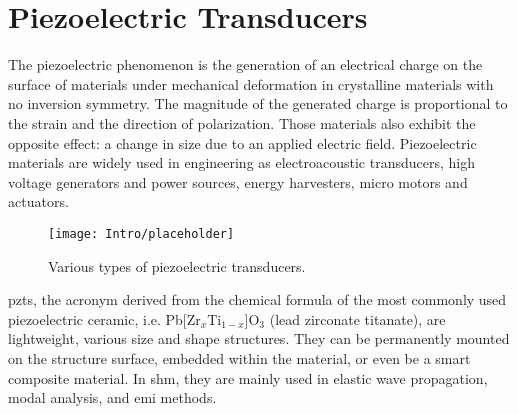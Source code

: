\section{Piezoelectric Transducers}
\label{sec:PZT}

The piezoelectric phenomenon is the generation of an electrical charge on the surface of materials under mechanical deformation in crystalline materials with no inversion symmetry.
The magnitude of the generated charge is proportional to the strain and the direction of polarization.
Those materials also exhibit the opposite effect: a change in size due to an applied electric field.
Piezoelectric materials are widely used in engineering as electroacoustic transducers, high voltage generators and power sources, energy harvesters, micro motors and actuators.
\begin{figure}[H]
	\texttt{[image: Intro/placeholder]}
	\caption{Various types of piezoelectric transducers.}
	\label{fig:piezo}
\end{figure}
\Acp{pzt}, the acronym derived from the chemical formula of the most commonly used piezoelectric ceramic, i.e. Pb[Zr\(_x\)Ti\(_{1-x}\)]O\(_3\) (lead zirconate titanate), are lightweight, various size and shape structures. 
They can be permanently mounted on the structure surface, embedded within the material, or even be a smart composite material.
In \ac{shm}, they are mainly used in elastic wave propagation, modal analysis, and \ac{emi} methods.